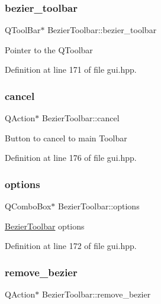 \subsubsection{\texorpdfstring{bezier\+\_\+toolbar}{bezier\_toolbar}}
{\footnotesize\ttfamily Q\+Tool\+Bar$\ast$ Bezier\+Toolbar\+::bezier\+\_\+toolbar}

Pointer to the Q\+Toolbar 

Definition at line 171 of file gui.\+hpp.

\mbox{\label{structBezierToolbar_a5c91775ecfd6725f3707b5b838bcbbf9}} 
\subsubsection{\texorpdfstring{cancel}{cancel}}
{\footnotesize\ttfamily Q\+Action$\ast$ Bezier\+Toolbar\+::cancel}

Button to cancel to main Toolbar 

Definition at line 176 of file gui.\+hpp.

\mbox{\label{structBezierToolbar_a84666bca25e5b6c194adaf0461c30ec3}} 
\subsubsection{\texorpdfstring{options}{options}}
{\footnotesize\ttfamily Q\+Combo\+Box$\ast$ Bezier\+Toolbar\+::options}

\mbox{\hyperlink{structBezierToolbar}{Bezier\+Toolbar}} options 

Definition at line 172 of file gui.\+hpp.

\mbox{\label{structBezierToolbar_a1e1fd77e3baf09d382973b1ede4247cd}} 
\subsubsection{\texorpdfstring{remove\+\_\+bezier}{remove\_bezier}}
{\footnotesize\ttfamily Q\+Action$\ast$ Bezier\+Toolbar\+::remove\+\_\+bezier}

